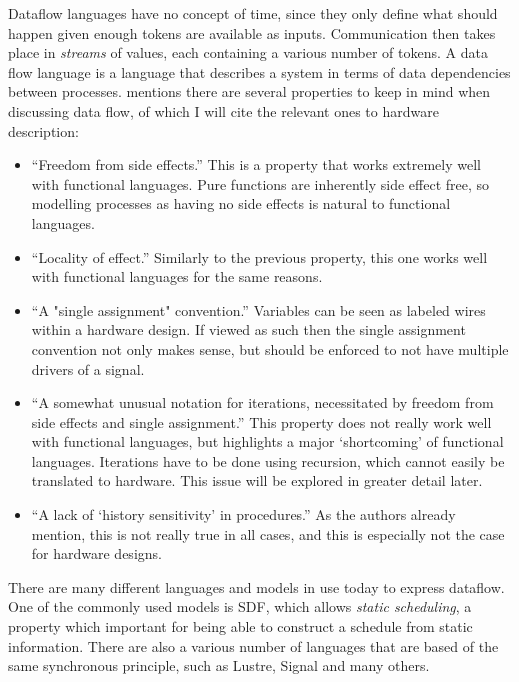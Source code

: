 Dataflow languages have no concept of time, since they only define what should happen given enough tokens are available as inputs.
Communication then takes place in \textit{streams} of values, each containing a various number of tokens.
A data flow language is a language that describes a system in terms of data dependencies between processes. 
\cite{ackerman1982data} mentions there are several properties to keep in mind when discussing data flow, of which I will cite the relevant ones to hardware description:
\begin{itemize}
 \item 
    ``Freedom from side effects.''
    This is a property that works extremely well with functional languages.
    Pure functions are inherently side effect free, so modelling processes as having no side effects is natural to functional languages.
 \item
    ``Locality of effect.''
    Similarly to the previous property, this one works well with functional languages for the same reasons.
 \item 
    ``A "single assignment" convention.''
    Variables can be seen as labeled wires within a hardware design. 
    If viewed as such then the single assignment convention not only makes sense, but should be enforced to not have multiple drivers of a signal.
 \item 
    ``A somewhat unusual notation for iterations, necessitated by freedom from side effects and single assignment.''
    This property does not really work well with functional languages, but highlights a major `shortcoming' of functional languages. Iterations have to be done using recursion, which cannot easily be translated to hardware. This issue will be explored in greater detail later.
 \item
    ``A lack of `history sensitivity' in procedures.'' 
    As the authors already mention, this is not really true in all cases, and this is especially not the case for hardware designs.
\end{itemize}

There are many different languages and models in use today to express dataflow.
One of the commonly used models is SDF\cite{lee1987synchronous}, which allows \textit{static scheduling}, a property which important for being able to construct a schedule from static information.
There are also a various number of languages that are based of the same synchronous principle, such as Lustre\cite{halbwachs1991synchronous}, Signal\cite{amagbegnon1995implementation} and many others.
